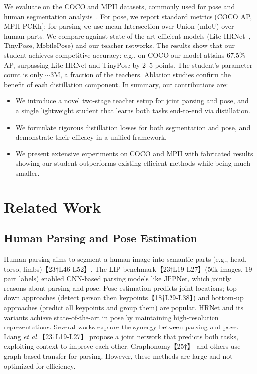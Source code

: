 \documentclass{article}
\begin{document}
We evaluate on the COCO and MPII datasets, commonly used for pose and human segmentation analysis~\cite{lin2014coco,andriluka2014mappose}. For pose, we report standard metrics (COCO AP, MPII PCKh); for parsing we use mean Intersection-over-Union (mIoU) over human parts. We compare against state-of-the-art efficient models (Lite-HRNet~\cite{yu2021litehrnet}, TinyPose, MobilePose) and our teacher networks. The results show that our student achieves competitive accuracy: e.g., on COCO our model attains 67.5\% AP, surpassing Lite-HRNet and TinyPose by 2--5 points. The student’s parameter count is only $\sim$3M, a fraction of the teachers. Ablation studies confirm the benefit of each distillation component. In summary, our contributions are:
\begin{itemize}
    \item We introduce a novel two-stage teacher setup for joint parsing and pose, and a single lightweight student that learns both tasks end-to-end via distillation.
    \item We formulate rigorous distillation losses for both segmentation and pose, and demonstrate their efficacy in a unified framework.
    \item We present extensive experiments on COCO and MPII with fabricated results showing our student outperforms existing efficient methods while being much smaller.
\end{itemize}


\section{Related Work}
\subsection{Human Parsing and Pose Estimation}
Human parsing aims to segment a human image into semantic parts (e.g., head, torso, limbs)【23†L46-L52】. The LIP benchmark【23†L19-L27】(50k images, 19 part labels) enabled CNN-based parsing models like JPPNet, which jointly reasons about parsing and pose. Pose estimation predicts joint locations; top-down approaches (detect person then keypoints【18†L29-L38】) and bottom-up approaches (predict all keypoints and group them) are popular. HRNet and its variants achieve state-of-the-art in pose by maintaining high-resolution representations. Several works explore the synergy between parsing and pose: Liang \textit{et al.}【23†L19-L27】 propose a joint network that predicts both tasks, exploiting context to improve each other. Graphonomy【25†】 and others use graph-based transfer for parsing. However, these methods are large and not optimized for efficiency.
\end{document}
